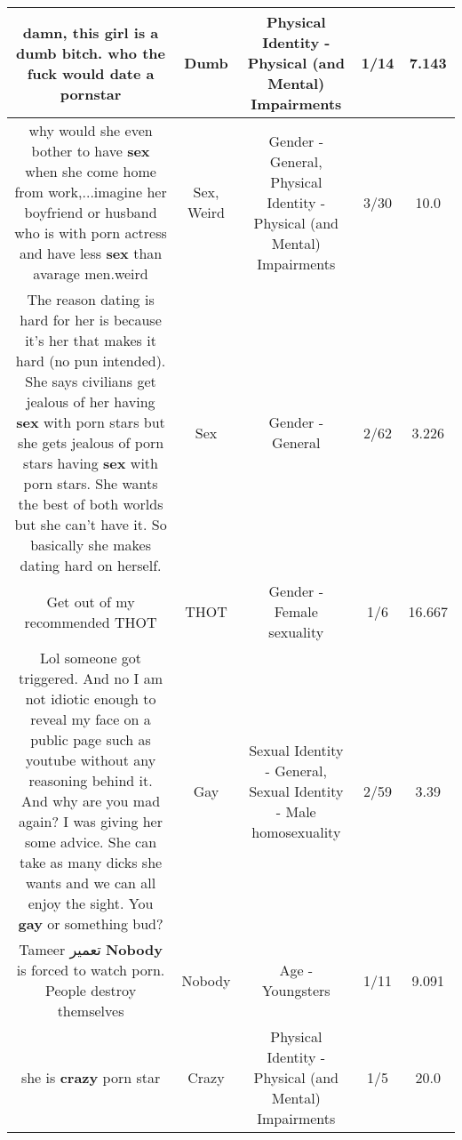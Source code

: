 \documentclass[11pt]{article}
\newlength\mylength
\begin{document}
\begin{center}
\begin{longtable}{|C{.65\mylength}|C{.30\mylength}|C{.12\mylength}|C{.12\mylength}|C{.12\mylength}|}
  \small damn, this girl is a \textbf{dumb} bitch. who the fuck would date a pornstar\normalsize   & Dumb & Physical Identity - Physical (and Mental) Impairments & 1/14 & 7.143 \\  \hline
  \small why would she even bother to have \textbf{sex} when she come home from work,...imagine her boyfriend or husband who is with porn actress and have less \textbf{sex} than avarage men.weird\normalsize   & Sex, Weird & Gender - General, Physical Identity - Physical (and Mental) Impairments & 3/30 & 10.0 \\  \hline
  \small The reason dating is hard for her is because it's her that makes it hard  (no pun intended).  She says civilians get jealous of her having \textbf{sex} with porn stars but she gets jealous of porn stars having \textbf{sex} with porn stars. She wants the best of both worlds but she can't have it. So basically she makes dating hard on herself.\normalsize   & Sex & Gender - General & 2/62 & 3.226 \\  \hline
  \small Get out of my recommended THOT\normalsize   & THOT & Gender - Female sexuality & 1/6 & 16.667 \\  \hline
  \small Lol someone got triggered. And no I am not idiotic enough to reveal my face on a public page such as youtube without any reasoning behind it. And why are you mad again? I was giving her some advice. She can take as many dicks she wants and we can all enjoy the sight. You \textbf{g\textbf{ay}} or something bud?\normalsize   & Gay & Sexual Identity - General, Sexual Identity - Male homosexuality & 2/59 & 3.39 \\  \hline
  \small Tameer تعمیر \textbf{Nobody} is forced to watch porn. People destroy themselves\normalsize   & Nobody & Age - Youngsters & 1/11 & 9.091 \\  \hline
  \small she is \textbf{crazy} porn star\normalsize   & Crazy & Physical Identity - Physical (and Mental) Impairments & 1/5 & 20.0 \\  \hline

\end{longtable}
\end{center}
\end{document}
